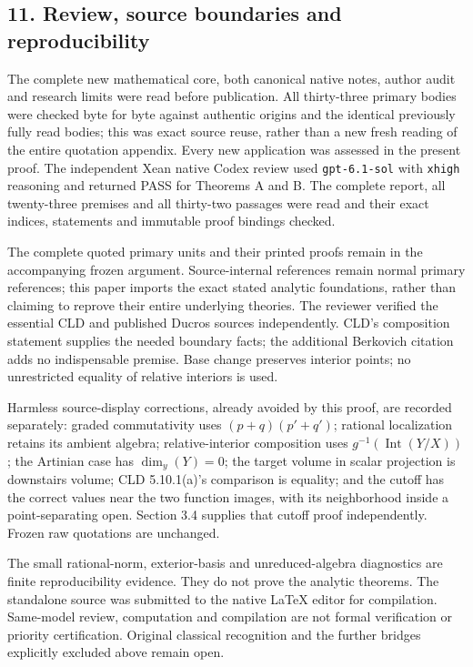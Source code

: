 \documentclass[
  10pt,
]{article}
\begin{document}
\subsection{11. Review, source boundaries and reproducibility}

The complete new mathematical core, both canonical native notes, author
audit and research limits were read before publication. All thirty-three
primary bodies were checked byte for byte against authentic origins and
the identical previously fully read bodies; this was exact source reuse,
rather than a new fresh reading of the entire quotation appendix.
Every new application was assessed in the present proof. The independent
Xean native Codex review used \texttt{gpt-6.1-sol} with \texttt{xhigh}
reasoning and returned PASS for Theorems A and B. The complete report,
all twenty-three premises and all thirty-two passages were read and
their exact indices, statements and immutable proof bindings checked.

The complete quoted primary units and their printed proofs remain in
the accompanying frozen argument. Source-internal references remain
normal primary references; this paper imports the exact stated analytic
foundations, rather than claiming to reprove their entire underlying
theories. The reviewer verified the essential CLD and published Ducros
sources independently. CLD's composition statement supplies the needed
boundary facts; the additional Berkovich citation adds no indispensable
premise. Base change preserves interior points; no unrestricted equality
of relative interiors is used.

Harmless source-display corrections, already avoided by this proof,
are recorded separately: graded commutativity uses
\((p+q)(p'+q')\); rational localization retains its ambient algebra;
relative-interior composition uses \(g^{-1}(\operatorname{Int}(Y/X))\);
the Artinian case has \(\dim_y(Y)=0\); the target volume in scalar
projection is downstairs volume; CLD 5.10.1(a)'s comparison is equality;
and the cutoff has the correct values near the two function images,
with its neighborhood inside a point-separating open. Section 3.4 supplies
that cutoff proof independently. Frozen raw quotations are unchanged.

The small rational-norm, exterior-basis and unreduced-algebra diagnostics
are finite reproducibility evidence. They do not prove the analytic
theorems. The standalone source was submitted to the native LaTeX editor
for compilation. Same-model review, computation and compilation are
not formal verification or priority certification. Original classical
recognition and the further bridges explicitly excluded above remain open.
\end{document}
